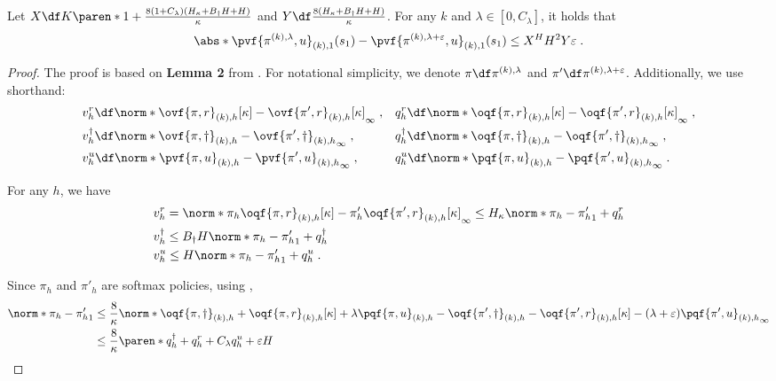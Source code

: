 \begin{lemma}\label{lemma:lambda-sensitive}
Let $X \df K \paren*{1 + \frac{8(1+C_\lambda)(H_\kappa + B_\dagger H + H)}{\kappa}}$ 
and 
$Y \df \frac{8(H_\kappa + B_\dagger H + H)}{\kappa}$.
For any $k$ and $\lambda \in [0, C_\lambda]$, it holds that
\begin{align*}
\abs*{\pvf{\pi^{(k), \lambda}, u}_{(k), 1}(s_1)
- \pvf{\pi^{(k), \lambda + \varepsilon}, u}_{(k), 1}(s_1)}
\leq X^H H^2 Y \varepsilon\;.
\end{align*}   
\end{lemma}
\begin{proof}
The proof is based on \textbf{Lemma 2} from \citet{ghosh2024towards}.
For notational simplicity, we denote $\pi \df \pi^{(k), \lambda}$ and $\pi' \df \pi^{(k), \lambda + \varepsilon}$.
Additionally, we use shorthand:
\begin{align*}
&v_h^r \df \norm*{\ovf{\pi, r}_{(k), h}[\kappa] - \ovf{\pi', r}_{(k), h}[\kappa]}_\infty\;,
&&q_h^r \df \norm*{\oqf{\pi, r}_{(k), h}[\kappa] - \oqf{\pi', r}_{(k), h}[\kappa]}_\infty\;,
\\
&v_h^\dagger \df \norm*{\ovf{\pi, \dagger}_{(k), h} - \ovf{\pi', \dagger}_{(k), h}}_\infty\;,
&&q_h^\dagger \df \norm*{\oqf{\pi, \dagger}_{(k), h} - \oqf{\pi', \dagger}_{(k), h}}_\infty\;,\\
&v_h^u \df \norm*{\pvf{\pi, u}_{(k), h} - \pvf{\pi', u}_{(k), h}}_\infty \;,
&&q_h^u \df \norm*{\pqf{\pi, u}_{(k), h} - \pqf{\pi', u}_{(k), h}}_\infty \;.
\end{align*}

For any $h$, we have
\begin{align*}
&v_h^r = \norm*{ \pi_h\oqf{\pi, r}_{(k), h}[\kappa] - \pi'_h \oqf{\pi', r}_{(k), h}[\kappa]}_\infty \leq H_\kappa\norm*{\pi_h - \pi'_h}_1 + q^r_h \\
&v_h^\dagger \leq B_\dagger H\norm*{\pi_h - \pi'_h}_1 + q_h^\dagger\\
&v_h^u \leq H\norm*{\pi_h - \pi'_h}_1 + q_h^u\;.
\end{align*}

Since $\pi_h$ and $\pi'_h$ are softmax policies, using ,
\begin{align*}
\norm*{\pi_h - \pi'_h}_1
&\leq 
\frac{8}{\kappa}\norm*{
\oqf{\pi, \dagger}_{(k), h} 
+ \oqf{\pi, r}_{(k), h}[\kappa] 
+ \lambda \pqf{\pi, u}_{(k), h}
- \oqf{\pi', \dagger}_{(k), h}
-\oqf{\pi', r}_{(k), h}[\kappa]
- (\lambda+\varepsilon) \pqf{\pi', u}_{(k), h}}_\infty\\
&\leq 
\frac{8}{\kappa}
\paren*{
q_h^\dagger
+ q_h^r
+C_\lambda q_h^u
+ \varepsilon H
}
\end{align*}


\end{proof}
